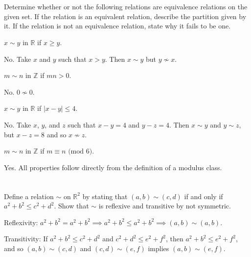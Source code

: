 \section{}\label{sec:25}

Determine whether or not the following relations are equivalence relations on the given set. If the relation is an equivalent relation, describe the partition given by it. If the relation is not an equivalence relation, state why it fails to be one.

\begin{exlist}
    \item $x \sim y$ in $\mathbb{R}$ if $x \geq y$.

    \smallskip

    No. Take $x$ and $y$ such that $x > y$. Then $x \sim y$ but $y \nsim x$.

    \item $m \sim n$ in $\mathbb{Z}$ if $mn > 0$.

    \smallskip

    No. $0 \nsim 0$.

    \item $x \sim y$ in $\mathbb{R}$ if $|x - y| \leq 4$.

    \smallskip

    No. Take $x$, $y$, and $z$ such that $x - y = 4$ and $y - z = 4$. Then $x \sim y$ and $y \sim z$, but $x - z = 8$ and so $x \nsim z$.

    \item $m \sim n$ in $\mathbb{Z}$ if $m \equiv n \text{ (mod 6)}$.

    \smallskip

    Yes. All properties follow directly from the definition of a modulus class.
\end{exlist}

\section{}\label{sec:26}

Define a relation $\sim$ on $\mathbb{R}^2$ by stating that $(a, b) \sim (c, d)$ if and only if $a^2 + b^2 \leq c^2 + d^2$. Show that $\sim$ is reflexive and transitive by not symmetric.
\hr

Reflexivity: $a^2 + b^2 = a^2 + b^2 \implies a^2 + b^2 \leq a^2 + b^2 \implies (a, b) \sim (a, b)$.

\smallskip

Transitivity: If $a^2 + b^2 \leq c^2 + d^2$ and $c^2 + d^2 \leq e^2 + f^2$, then $a^2 + b^2 \leq e^2 + f^2$, and so $(a, b) \sim (c, d)$ and $(c, d) \sim (e, f)$ implies $(a, b) \sim (e, f)$.

